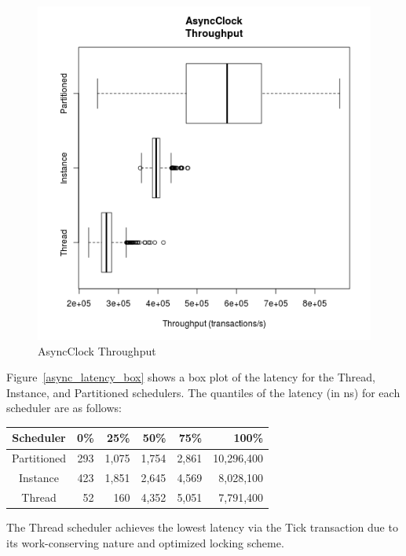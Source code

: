 \begin{figure}
\center
\includegraphics[height=.4\textheight]{async_throughput_box.png}
\caption{AsyncClock Throughput}
\label{async_throughput_box}
\end{figure}

Figure~\ref{async_latency_box} shows a box plot of the latency for the Thread, Instance, and Partitioned schedulers.
The quantiles of the latency (in ns) for each scheduler are as follows:
\begin{center}
\begin{tabular}{crrrrr}
Scheduler &       0\%  &    25\%  &    50\%  &    75\%  &   100\% \\
\hline
Partitioned & 293 & 1,075 & 1,754 & 2,861 & 10,296,400 \\
Instance    & 423 & 1,851 & 2,645 & 4,569 &  8,028,100 \\
Thread      &  52 &   160 & 4,352 & 5,051 &  7,791,400 \\
\end{tabular}
\end{center}
The Thread scheduler achieves the lowest latency via the Tick transaction due to its work-conserving nature and optimized locking scheme.

